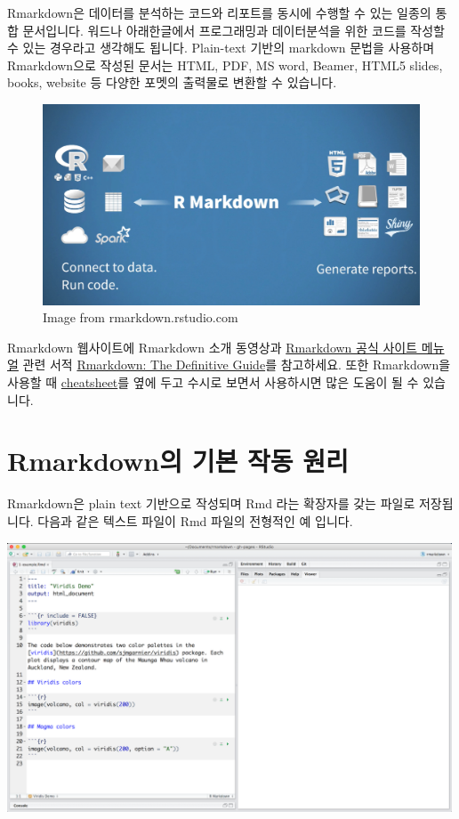 \documentclass[
]{book}
\begin{document}
Rmarkdown은 데이터를 분석하는 코드와 리포트를 동시에 수행할 수 있는 일종의 통합 문서입니다. 워드나 아래한글에서 프로그래밍과 데이터분석을 위한 코드를 작성할 수 있는 경우라고 생각해도 됩니다. Plain-text 기반의 markdown 문법을 사용하며 Rmarkdown으로 작성된 문서는 HTML, PDF, MS word, Beamer, HTML5 slides, books, website 등 다양한 포멧의 출력물로 변환할 수 있습니다.

\begin{figure}
\centering
\includegraphics[width=5.20833in,height=\textheight]{images/rmarkdown/rmarkdown-01.PNG}
\caption{Image from rmarkdown.rstudio.com}
\end{figure}

Rmarkdown 웹사이트에 Rmarkdown 소개 동영상과 \href{https://rmarkdown.rstudio.com/lesson-1.html}{Rmarkdown 공식 사이트 메뉴얼} 관련 서적 \href{https://bookdown.org/yihui/rmarkdown/}{Rmarkdown: The Definitive Guide}를 참고하세요. 또한 Rmarkdown을 사용할 때 \href{https://github.com/rstudio/cheatsheets/raw/master/rmarkdown-2.0.pdf}{cheatsheet}를 옆에 두고 수시로 보면서 사용하시면 많은 도움이 될 수 있습니다.

\hypertarget{rmarkdownuxc758-uxae30uxbcf8-uxc791uxb3d9-uxc6d0uxb9ac}{%
\section{Rmarkdown의 기본 작동 원리}\label{rmarkdownuxc758-uxae30uxbcf8-uxc791uxb3d9-uxc6d0uxb9ac}}

Rmarkdown은 plain text 기반으로 작성되며 Rmd 라는 확장자를 갖는 파일로 저장됩니다. 다음과 같은 텍스트 파일이 Rmd 파일의 전형적인 예 입니다.

\includegraphics[width=5.20833in,height=\textheight]{images/rmarkdown/how-1-file.png}
\end{document}
